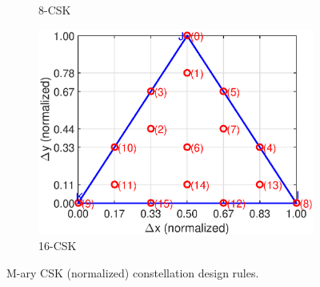 \documentclass[10pt,letterpaper]{article}
\begin{document}
\begin{figure}[t]
\begin{subfigure}{0.32\textwidth}
			\caption{8-CSK}
			\label{fig8Const}
		\end{subfigure}
		\hfill
		\begin{subfigure}{0.32\textwidth}
		\centering
			\includegraphics[trim={0.05in 0.0in 0.25in 0.2in}, clip=true, width=\textwidth]{CBCrules16.eps}
			\caption{16-CSK}
			\label{fig16Const}
		\end{subfigure}
	\caption{M-ary CSK (normalized) constellation design rules.}
	\label{figConst}
\end{figure}
\end{document}
